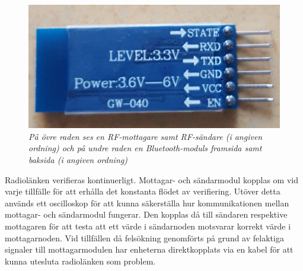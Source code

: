 \documentclass[a4paper]{article}
\begin{document}
\begin{figure}[H]
\includegraphics[scale=0.078]{BluetoothBack.jpg}

\caption{\it På övre raden ses en RF-mottagare samt RF-sändare (i angiven ordning) och på undre raden en Bluetooth-moduls framsida samt baksida (i angiven ordning)}
\end{figure} 




\vspace{5mm} \noindent
Radiolänken verifieras kontinuerligt. Mottagar- och sändarmodul kopplas om vid varje tillfälle för att erhålla det konstanta flödet av verifiering. Utöver detta används ett oscilloskop för att kunna säkerställa hur kommunikationen mellan mottagar- och sändarmodul fungerar. Den kopplas då till sändaren respektive mottagaren för att testa att ett värde i sändarnoden motsvarar korrekt värde i mottagarnoden. Vid tillfällen då felsökning genomförts på grund av felaktiga signaler till mottagarmodulen har enheterna direktkopplats via en kabel för att kunna utesluta radiolänken som problem.




\end{document}
